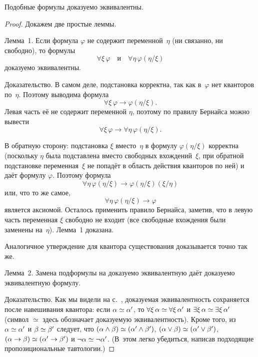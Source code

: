 \begin{theorem}
%
        \label{renaming-variables-theorem}%
Подобные формулы доказуемо эквивалентны.
\end{theorem}

\begin{proof}
Докажем две простые леммы.

\textsf{Лемма~1}. Если формула $\varphi$ не содержит переменной~$\eta$
(ни связанно, ни свободно), то формулы
        $$
\forall\xi\,\varphi \quad \text{и}\quad \forall\eta\,\varphi(\eta/\xi)
        $$
доказуемо эквивалентны.

Доказательство. В самом деле, подстановка корректна, так как в~$\varphi$
нет кванторов по~$\eta$. Поэтому выводима формула
        $$
\forall\xi\,\varphi \to \varphi(\eta/\xi).
        $$
Левая часть её не содержит переменной $\eta$, поэтому по правилу
Бернайса можно вывести
        $$
\forall\xi\, \varphi \to \forall\eta\,\varphi(\eta/\xi).
        $$

В обратную сторону:
подстановка $\xi$ вместо~$\eta$ в формулу $\varphi(\eta/\xi)$
корректна (поскольку $\eta$ была подставлена вместо свободных
вхождений~$\xi$, при обратной подстановке переменная~$\xi$ не
попадёт в область действия кванторов по ней) и даёт формулу $\varphi$.
Поэтому формула
        $$
\forall\eta\,\varphi(\eta/\xi)\to \varphi(\eta/\xi)(\xi/\eta)
        $$
или, что то же самое,
        $$
\forall\eta\,\varphi(\eta/\xi)\to \varphi
        $$
является аксиомой. Осталось применить правило Бернайса, заметив,
что в левую часть переменная $\xi$ свободно не входит (все свободные
вхождения были заменены на~$\eta$). Лемма~1 доказана.

Аналогичное утверждение для квантора существования доказывается
точно так же.

\textsf{Лемма~2.} Замена подформулы на доказуемо эквивалентную
даёт доказуемо эквивалентную формулу.
     \label{changing-parts}%

Доказательство. Как мы видели на
с.~\pageref{adding-quantifiers}, доказуемая эквивалентность
сохраняется после навешивания квантора: если
$\alpha\hm\simeq\alpha'$, то
$\forall\xi\,\alpha\hm\simeq\forall\xi\,\alpha'$ и
$\exists\xi\,\alpha\hm\simeq\exists\xi\,\alpha'$ (символ
$\simeq$ здесь обозначает доказуемую эквивалентность).
Кроме того, из $\alpha\hm\simeq\alpha'$ и $\beta\hm\simeq\beta'$
следует, что ${(\alpha\land\beta)}\hm\simeq{(\alpha'\land\beta')}$,
             ${(\alpha\lor\beta)}\hm\simeq{(\alpha'\lor\beta')}$,
             ${(\alpha\to\beta)}\hm\simeq{(\alpha'\to\beta')}$ и
             $\lnot\alpha\hm\simeq\lnot\alpha'$.
(В~этом легко убедиться, написав подходящие пропозициональные
тавтологии.)


\end{proof}
